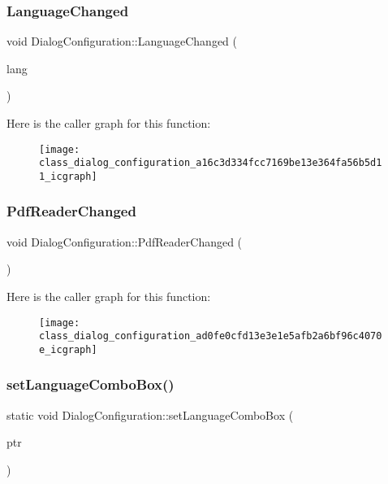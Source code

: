 \subsubsection{Language\+Changed}
{\footnotesize\ttfamily void Dialog\+Configuration\+::\+Language\+Changed (\begin{DoxyParamCaption}\item[{Q\+String}]{lang }\end{DoxyParamCaption})\hspace{0.3cm}{\ttfamily [signal]}}

Here is the caller graph for this function\+:\nopagebreak
\begin{figure}[H]
\begin{center}
\leavevmode
\texttt{[image: class\_dialog\_configuration\_a16c3d334fcc7169be13e364fa56b5d11\_icgraph]}
\end{center}
\end{figure}
\mbox{\label{class_dialog_configuration_ad0fe0cfd13e3e1e5afb2a6bf96c4070e}} 
\subsubsection{Pdf\+Reader\+Changed}
{\footnotesize\ttfamily void Dialog\+Configuration\+::\+Pdf\+Reader\+Changed (\begin{DoxyParamCaption}{ }\end{DoxyParamCaption})\hspace{0.3cm}{\ttfamily [signal]}}

Here is the caller graph for this function\+:\nopagebreak
\begin{figure}[H]
\begin{center}
\leavevmode
\texttt{[image: class\_dialog\_configuration\_ad0fe0cfd13e3e1e5afb2a6bf96c4070e\_icgraph]}
\end{center}
\end{figure}
\mbox{\label{class_dialog_configuration_a654c54543413073208c71774455ca1a8}} 
\subsubsection{set\+Language\+Combo\+Box()}
{\footnotesize\ttfamily static void Dialog\+Configuration\+::set\+Language\+Combo\+Box (\begin{DoxyParamCaption}\item[{Q\+Combo\+Box $\ast$}]{ptr }\end{DoxyParamCaption})\hspace{0.3cm}{\ttfamily [static]}}

